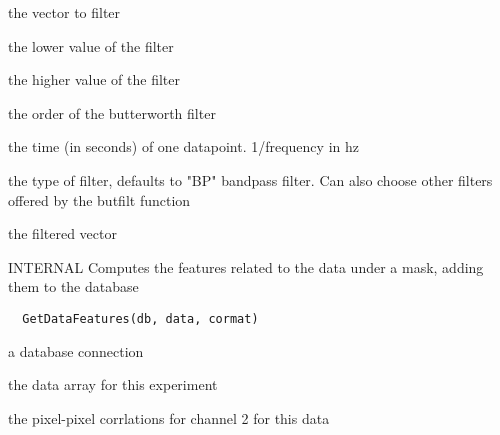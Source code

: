 \documentclass[a4paper]{book}
\begin{document}
%
\begin{Arguments}
\begin{ldescription}
\item[\code{vec}] the vector to filter

\item[\code{low}] the lower value of the filter

\item[\code{high}] the higher value of the filter

\item[\code{order}] the order of the butterworth filter

\item[\code{dt}] the time (in seconds) of one datapoint.
1/frequency in hz

\item[\code{type}] the type of filter, defaults to "BP" bandpass
filter. Can also choose other filters offered by the
butfilt function
\end{ldescription}
\end{Arguments}
%
\begin{Value}
the filtered vector
\end{Value}
%
\begin{Description}\relax
INTERNAL Computes the features related to the data under
a mask, adding them to the database
\end{Description}
%
\begin{Usage}
\begin{verbatim}
  GetDataFeatures(db, data, cormat)
\end{verbatim}
\end{Usage}
%
\begin{Arguments}
\begin{ldescription}
\item[\code{db}] a database connection

\item[\code{data}] the data array for this experiment

\item[\code{cormat}] the pixel-pixel corrlations for channel 2
for this data
\end{ldescription}
\end{Arguments}
%
\end{document}
